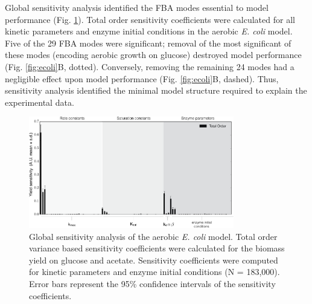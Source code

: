 \documentclass[10pt,twocolumn,twoside,final]{IEEEtran}
\begin{document}
Global sensitivity analysis identified the FBA modes essential to model performance (Fig. \ref{fig:sensitivity}).
Total order sensitivity coefficients were calculated for all kinetic parameters and enzyme initial conditions in the aerobic \textit{E. coli} model.
Five of the 29 FBA modes were significant;
removal of the most significant of these modes (encoding aerobic growth on glucose) destroyed model performance (Fig. \ref{fig:ecoli}B, dotted).
Conversely, removing the remaining 24 modes had a negligible effect upon model performance (Fig. \ref{fig:ecoli}B, dashed).
Thus, sensitivity analysis identified the minimal model structure required to explain the experimental data.

\begin{figure}[!t]\centering
\includegraphics[width=0.80\textwidth]{./figs/Fig-3-Sensitivity-Results.pdf}
\caption{Global sensitivity analysis of the aerobic \textit{E. coli} model.
Total order variance based sensitivity coefficients were calculated for the biomass yield on glucose and acetate.
Sensitivity coefficients were computed for kinetic parameters and enzyme initial conditions (N = 183,000).
Error bars represent the 95\% confidence intervals of the sensitivity coefficients.
}
\label{fig:sensitivity}
\end{figure}
\end{document}
